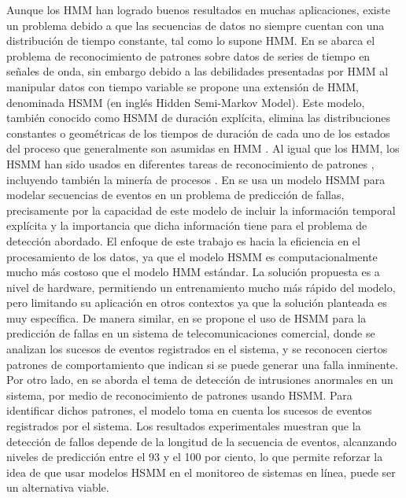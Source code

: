 Aunque los HMM han logrado buenos resultados en muchas aplicaciones, existe un problema debido a que las secuencias de datos no siempre cuentan con una distribución de tiempo constante, tal como lo supone HMM. En \cite{Ge2000} se abarca el problema de reconocimiento de patrones sobre datos de series de tiempo en señales de onda, sin embargo debido a las debilidades presentadas por HMM al manipular datos con tiempo variable se propone una extensión de HMM, denominada HSMM (en inglés Hidden Semi-Markov Model). Este modelo, también conocido como HSMM de duración explícita, elimina las distribuciones constantes o geométricas de los tiempos de duración de cada uno de los estados del proceso que generalmente son asumidas en HMM \cite{Yu2006}. Al igual que los HMM, los HSMM han sido usados en diferentes tareas de reconocimiento de patrones \cite{Camara2015,Tan2008}, incluyendo también la minería de procesos \cite{Maurer2014}. En \cite{Maurer2014} se usa un modelo HSMM para modelar secuencias de eventos en un problema de predicción de fallas, precisamente por la capacidad de este modelo de incluir la información temporal explícita y la importancia que dicha información tiene para el problema de detección abordado. El enfoque de este trabajo es hacia la eficiencia en el procesamiento de los datos, ya que el modelo HSMM es computacionalmente mucho más costoso que el modelo HMM estándar. La solución propuesta es a nivel de hardware, permitiendo un entrenamiento mucho más rápido del modelo, pero limitando su aplicación en otros contextos ya que la solución planteada es muy específica. De manera similar, en \cite{Salfner2007} se propone el uso de HSMM para la predicción de fallas en un sistema de telecomunicaciones comercial, donde se analizan los sucesos de eventos registrados en el sistema, y se reconocen ciertos patrones de comportamiento que indican si se puede generar una falla inminente. Por otro lado, en \cite{Tan2008} se aborda el tema de detección de intrusiones anormales en un sistema, por medio de reconocimiento de patrones usando HSMM. Para identificar dichos patrones, el modelo toma en cuenta los sucesos de eventos registrados por el sistema. Los resultados experimentales muestran que la detección de fallos depende de la longitud de la secuencia de eventos, alcanzando niveles de predicción entre el 93 y el 100 por ciento, lo que permite reforzar la idea de que usar modelos HSMM en el monitoreo de sistemas en línea, puede ser un alternativa viable.

